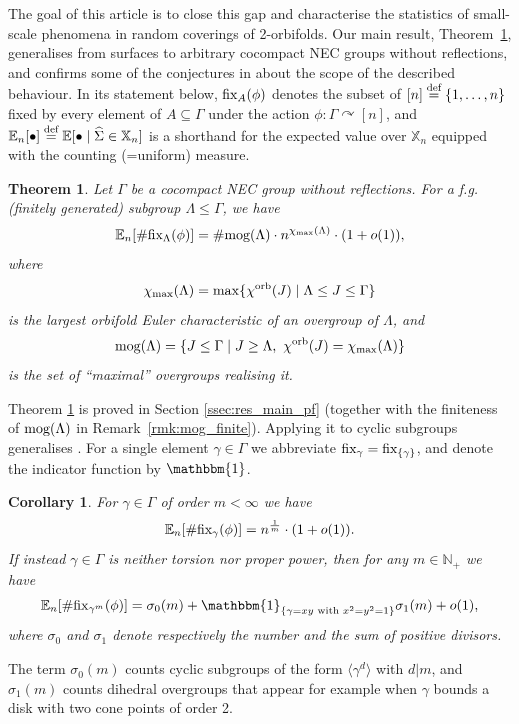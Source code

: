 \documentclass{amsart}
\newtheorem{corollary}[conjecture]{Corollary}
\newtheorem{theorem}[conjecture]{Theorem}
\newcommand{\cho}{\chi^{\textnormal{orb}}}
\newcommand{\covers}{\mathbb{X}_n}
\newcommand{\defeq}{\stackrel{\tn{def}}{=}}
\newcommand{\tn}{\textnormal}
\newcommand{\whS}{{\widehat{\Sigma}}}
\begin{document}
The goal of this article is to close this gap and characterise the statistics of small-scale phenomena in random coverings of 2-orbifolds. Our main result, Theorem~\ref{thm:alg_tf}, generalises \cite[Theorem 1.3]{asymptotic_stats_random_covering_surfaces_MageePuder23} from surfaces to arbitrary cocompact NEC groups without reflections, and confirms some of the conjectures in \cite[\S7]{local_stats_random_perms_free_prods_PuderZimhoni24} about the scope of the described behaviour. In its statement below, $\tn{fix}_A(\phi)$ denotes the subset of $[n]\defeq\{1,\dots,n\}$ fixed by every element of $A\subseteq\Gamma$ under the action $\phi\colon\Gamma\curvearrowright[n]$, and $\mathbb{E}_n[\bullet]\defeq\mathbb{E}[\bullet\mid\whS\in\covers]$ is a shorthand for the expected value over $\covers$ equipped with the counting (=uniform) measure.
\begin{theorem}\label{thm:alg_tf}
Let $\Gamma$ be a cocompact NEC group without reflections. For a f.g. (finitely generated) subgroup $\Lambda\leq\Gamma$, we have
\begin{equation*}
\mathbb{E}_n[\#\tn{fix}_\Lambda(\phi)]=\#\tn{mog}(\Lambda)\cdot n^{\chi_\tn{max}(\Lambda)}\cdot(1+o(1)),
\end{equation*}
where
\begin{equation*}
\chi_\tn{max}(\Lambda)=\max\{\cho(J)\mid\Lambda\le J\le\Gamma\}
\end{equation*}
is the largest orbifold Euler characteristic of an overgroup of $\Lambda$, and
\begin{equation*}
\tn{mog}(\Lambda)=\{J\le\Gamma\mid J\ge\Lambda,\ \cho(J)=\chi_\tn{max}(\Lambda)\}
\end{equation*}
is the set of ``maximal'' overgroups realising it.
\end{theorem}
Theorem \ref{thm:alg_tf} is proved in Section \ref{ssec:res_main_pf} (together with the finiteness of $\tn{mog}(\Lambda)$ in Remark~\ref{rmk:mog_finite}). Applying it to cyclic subgroups generalises \cite[Theorem 1.2]{asymptotic_stats_random_covering_surfaces_MageePuder23}. For a single element $\gamma\in\Gamma$ we abbreviate $\tn{fix}_\gamma=\tn{fix}_{\{\gamma\}}$, and denote the indicator function by $\mathbbm{1}$.
\begin{corollary}\label{cor:E_fixpt}
For $\gamma\in\Gamma$ of order $m<\infty$ we have
\begin{equation*}
\mathbb{E}_n[\#\tn{fix}_\gamma(\phi)]=n^{\frac{1}{m}}\cdot(1+o(1)).
\end{equation*}
If instead $\gamma\in\Gamma$ is neither torsion nor proper power, then for any $m\in\mathbb{N}_+$ we have
\begin{equation*}
\mathbb{E}_n[\#\tn{fix}_{\gamma^m}(\phi)]=\sigma_0(m)+\mathbbm{1}_{\{\gamma=xy\text{ with }x^2=y^2=1\}}\sigma_1(m)+o(1),
\end{equation*}
where $\sigma_0$ and $\sigma_1$ denote respectively the number and the sum of positive divisors.
\end{corollary}
The term $\sigma_0(m)$ counts cyclic subgroups of the form $\langle\gamma^d\rangle$ with $d|m$, and $\sigma_1(m)$ counts dihedral overgroups that appear for example when $\gamma$ bounds a disk with two cone points of order 2.
\end{document}
